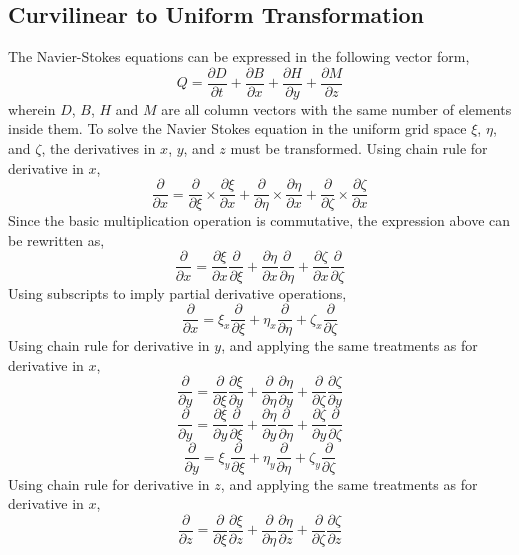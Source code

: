 \documentclass[a4paper, 12pt]{report}
\begin{document}
\begin{center}
\subsection{Curvilinear to Uniform Transformation}
\begin{comment}
\end{comment}
The Navier-Stokes equations can be expressed in the following vector form,
\begin{equation}
Q = \frac{\partial D}{\partial t} + \frac{\partial B}{\partial x} + \frac{\partial H}{\partial y} + \frac{\partial M}{\partial z}
\label{simplified Navier Stokes vector form}
\end{equation}
wherein $D$, $B$, $H$ and $M$ are all column vectors with the same number of elements inside them. To solve the Navier Stokes equation in the uniform grid space $\xi$, $\eta$, and $\zeta$, the derivatives in $x$, $y$, and $z$ must be transformed. Using chain rule for derivative in $x$,
$$\frac{\partial}{\partial x} = \frac{\partial}{\partial \xi}\times \frac{\partial\xi}{\partial x} + \frac{\partial}{\partial \eta}\times\frac{\partial\eta}{\partial x} + \frac{\partial}{\partial \zeta}\times\frac{\partial \zeta}{\partial x}$$
Since the basic multiplication operation is commutative, the expression above can be rewritten as,
$$\frac{\partial}{\partial x} =  \frac{\partial\xi}{\partial x}\frac{\partial}{\partial \xi} + \frac{\partial\eta}{\partial x}\frac{\partial}{\partial \eta} + \frac{\partial \zeta}{\partial x}\frac{\partial}{\partial \zeta}$$
Using subscripts to imply partial derivative operations,
$$\frac{\partial}{\partial x} =  \xi_{x}\frac{\partial}{\partial \xi} + \eta_{x}\frac{\partial}{\partial \eta} + \zeta_{x}\frac{\partial}{\partial \zeta}$$
Using chain rule for derivative in $y$, and applying the same treatments as for derivative in $x$,
$$\frac{\partial}{\partial y} = \frac{\partial}{\partial \xi}\frac{\partial\xi}{\partial y} + \frac{\partial}{\partial \eta}\frac{\partial \eta}{\partial y} + \frac{\partial}{\partial \zeta}\frac{\partial\zeta}{\partial y}$$
$$\frac{\partial}{\partial y} = \frac{\partial\xi}{\partial y}\frac{\partial}{\partial \xi} + \frac{\partial \eta}{\partial y}\frac{\partial}{\partial \eta} + \frac{\partial\zeta}{\partial y}\frac{\partial}{\partial \zeta}$$
$$\frac{\partial}{\partial y} = \xi_{y}\frac{\partial}{\partial \xi} + \eta_{y}\frac{\partial}{\partial \eta} + \zeta_{y}\frac{\partial}{\partial \zeta}$$
Using chain rule for derivative in $z$, and applying the same treatments as for derivative in $x$,
$$\frac{\partial}{\partial z} = \frac{\partial}{\partial\xi}\frac{\partial\xi}{\partial z} + \frac{\partial}{\partial\eta}\frac{\partial\eta}{\partial z} + \frac{\partial}{\partial\zeta}\frac{\partial\zeta}{\partial z}$$

\end{center}
\end{document}
